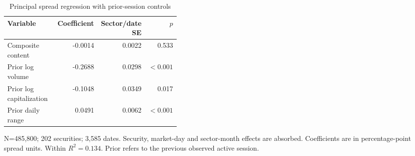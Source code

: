 \begin{table}[htbp]
\centering
\caption{Principal spread regression with prior-session controls}
\label{tab:primary}
\begin{minipage}{\linewidth}
\small
\setlength{\tabcolsep}{4pt}
\begingroup\centering
\begin{tabular}{p{0.41\linewidth}rrr}
\toprule
Variable & Coefficient & Sector/date SE & $p$ \\
\midrule
Composite content & -0.0014 & 0.0022 & 0.533 \\
Prior log volume & -0.2688 & 0.0298 & $<0.001$ \\
Prior log capitalization & -0.1048 & 0.0349 & 0.017 \\
Prior daily range & 0.0491 & 0.0062 & $<0.001$ \\
\bottomrule
\end{tabular}\par\endgroup
\par\vspace{0.5em}\footnotesize N=485,800; 202 securities; 3,585 dates. Security, market-day and sector-month effects are absorbed. Coefficients are in percentage-point spread units. Within $R^2=0.134$. Prior refers to the previous observed active session.
\end{minipage}
\end{table}

